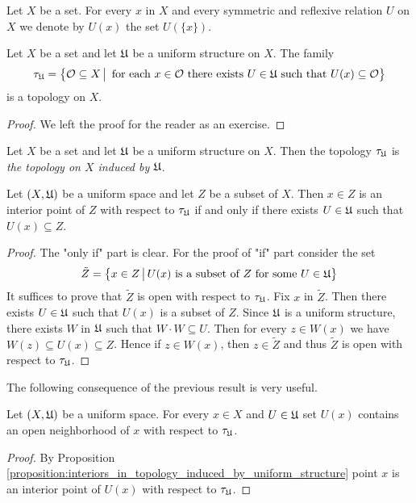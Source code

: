 \begin{remark}\label{remark:notation_for_ball}
Let $X$ be a set. For every $x$ in $X$ and every symmetric and reflexive relation $U$ on $X$ we denote by $U(x)$ the set $U(\{x\})$.
\end{remark}

\begin{fact}\label{fact:topology_induced_by_uniform_structure}
Let $X$ be a set and let ${\mathfrak U}$ be a uniform structure on $X$. The family
$$\tau_{{\mathfrak U}} = \big\{{\mathcal O}\subseteq X\,\big|\,\mbox{ for each }x\in {\mathcal O}\mbox{ there exists }U\in {\mathfrak U}\mbox{ such that }U(x) \subseteq {\mathcal O}\big\}$$
is a topology on $X$.
\end{fact}
\begin{proof}
We left the proof for the reader as an exercise.
\end{proof}

\begin{definition}
Let $X$ be a set and let ${\mathfrak U}$ be a uniform structure on $X$. Then the topology $\tau_{{\mathfrak U}}$ is \textit{the topology on $X$ induced by ${\mathfrak U}$}.
\end{definition}

\begin{proposition}\label{proposition:interiors_in_topology_induced_by_uniform_structure}
Let $(X,{\mathfrak U})$ be a uniform space and let $Z$ be a subset of $X$. Then $x\in Z$ is an interior point of $Z$ with respect to $\tau_{{\mathfrak U}}$ if and only if there exists $U \in {\mathfrak U}$ such that $U(x) \subseteq Z$.
\end{proposition}
\begin{proof}
The "only if" part is clear. For the proof of "if" part consider the set
$$\tilde{Z} = \big\{x\in Z\,\big|\,U(x)\mbox{ is a subset of }Z\mbox{ for some }U\in {\mathfrak U}\big\}$$ 
It suffices to prove that $\tilde{Z}$ is open with respect to $\tau_{{\mathfrak U}}$. Fix $x$ in $\tilde{Z}$. Then there exists $U \in {\mathfrak U}$ such that $U(x)$ is a subset of $Z$. Since ${\mathfrak U}$ is a uniform structure, there exists $W$ in ${\mathfrak U}$ such that $W\cdot W \subseteq U$. Then for every $z \in W(x)$ we have $W(z)\subseteq U(x)\subseteq Z$. Hence if $z \in W(x)$, then $z \in \tilde{Z}$ and thus $\tilde{Z}$ is open with respect to $\tau_{{\mathfrak U}}$.
\end{proof}
\noindent
The following consequence of the previous result is very useful.

\begin{corollary}\label{corollary:each_ball_is_an_open_neighborhood_with_respect_to_topology_induced_by_uniformity}
Let $(X,{\mathfrak U})$ be a uniform space. For every $x \in X$ and $U \in {\mathfrak U}$ set $U(x)$ contains an open neighborhood of $x$ with respect to $\tau_{{\mathfrak U}}$.
\end{corollary}
\begin{proof}
By Proposition \ref{proposition:interiors_in_topology_induced_by_uniform_structure} point $x$ is an interior point of $U(x)$ with respect to $\tau_{{\mathfrak U}}$.
\end{proof}

